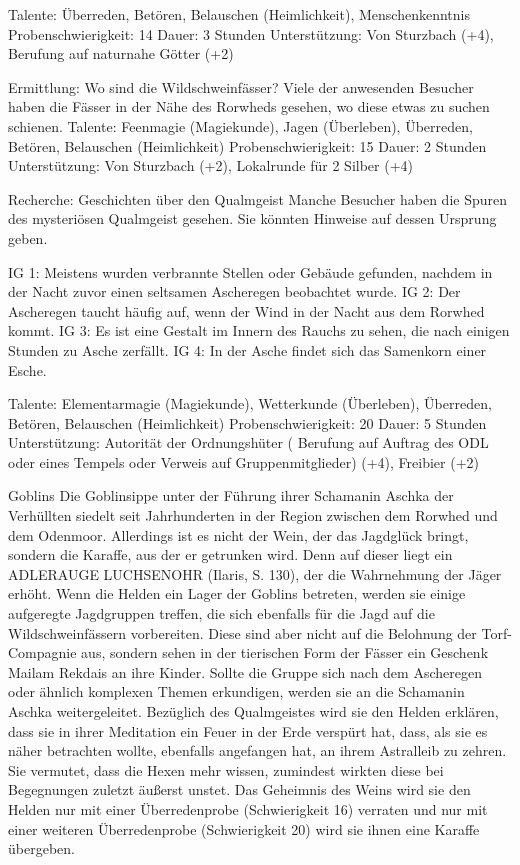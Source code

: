 Talente: Überreden, Betören, Belauschen (Heimlichkeit), Menschenkenntnis
Probenschwierigkeit: 14
Dauer: 3 Stunden
Unterstützung: Von Sturzbach (+4), Berufung auf naturnahe Götter (+2)

Ermittlung: Wo sind die Wildschweinfässer?
Viele der anwesenden Besucher haben die Fässer in der Nähe des Rorwheds gesehen, wo diese etwas zu suchen schienen.
Talente: Feenmagie (Magiekunde), Jagen (Überleben), Überreden, Betören, Belauschen (Heimlichkeit)
Probenschwierigkeit: 15
Dauer: 2 Stunden
Unterstützung: Von Sturzbach (+2), Lokalrunde für 2 Silber (+4)

Recherche: Geschichten über den Qualmgeist
Manche Besucher haben die Spuren des mysteriösen Qualmgeist gesehen. Sie könnten Hinweise auf dessen Ursprung geben.

IG 1: Meistens wurden verbrannte Stellen oder Gebäude gefunden, nachdem in der Nacht zuvor einen seltsamen Ascheregen beobachtet wurde.
IG 2: Der Ascheregen taucht häufig auf, wenn der Wind in der Nacht aus dem Rorwhed kommt.
IG 3: Es ist eine Gestalt im Innern des Rauchs zu sehen, die nach einigen Stunden zu Asche zerfällt.
IG 4: In der Asche findet sich das Samenkorn einer Esche.

Talente: Elementarmagie (Magiekunde), Wetterkunde (Überleben), Überreden, Betören, Belauschen (Heimlichkeit)
Probenschwierigkeit: 20
Dauer: 5 Stunden
Unterstützung: Autorität der Ordnungshüter ( Berufung auf Auftrag des ODL oder eines Tempels oder Verweis auf Gruppenmitglieder) (+4), Freibier (+2)

Goblins
Die Goblinsippe unter der Führung ihrer Schamanin Aschka der Verhüllten siedelt seit Jahrhunderten in der Region zwischen dem Rorwhed und dem Odenmoor.
Allerdings ist es nicht der Wein, der das Jagdglück bringt, sondern die Karaffe, aus der er getrunken wird. Denn auf dieser liegt ein ADLERAUGE LUCHSENOHR (Ilaris, S. 130), der die Wahrnehmung der Jäger erhöht.
Wenn die Helden ein Lager der Goblins betreten, werden sie einige aufgeregte Jagdgruppen treffen, die sich ebenfalls für die Jagd auf die Wildschweinfässern vorbereiten. Diese sind aber nicht auf die Belohnung der Torf-Compagnie aus, sondern sehen in der tierischen Form der Fässer ein Geschenk Mailam Rekdais an ihre Kinder.
Sollte die Gruppe sich nach dem Ascheregen oder ähnlich komplexen Themen erkundigen, werden sie an die Schamanin Aschka weitergeleitet. Bezüglich des Qualmgeistes wird sie den Helden erklären, dass sie in ihrer Meditation ein Feuer in der Erde verspürt hat, dass, als sie es näher betrachten wollte, ebenfalls angefangen hat, an ihrem Astralleib zu zehren. Sie vermutet, dass die Hexen mehr wissen, zumindest wirkten diese bei Begegnungen zuletzt äußerst unstet.
Das Geheimnis des Weins wird sie den Helden nur mit einer Überredenprobe (Schwierigkeit 16) verraten und nur mit einer weiteren Überredenprobe (Schwierigkeit 20) wird sie ihnen eine Karaffe übergeben.


